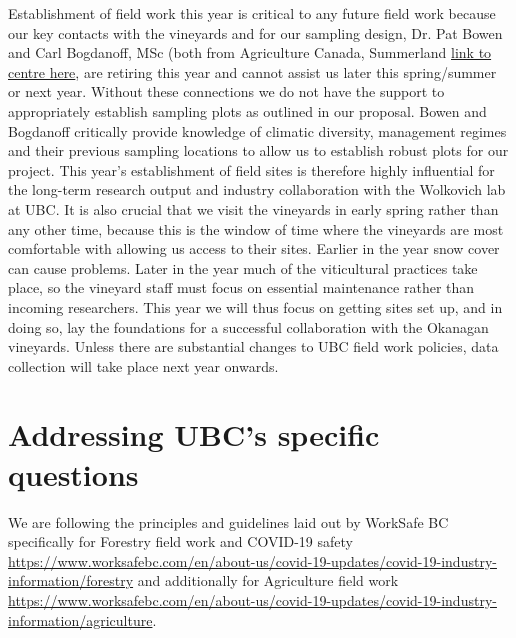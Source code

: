 \documentclass[11pt,letter]{article}
\begin{document}
Establishment of field work this year is critical to any future field work because our key contacts with the vineyards and for our sampling design, Dr. Pat Bowen and Carl Bogdanoff, MSc (both from Agriculture Canada, Summerland \href{https://profils-profiles.science.gc.ca/en/research-centre/summerland-research-and-development-centre}{link to centre here}, are retiring this year and cannot assist us later this spring/summer or next year. Without these connections we do not have the support to appropriately establish sampling plots as outlined in our proposal. Bowen and Bogdanoff critically provide knowledge of climatic diversity, management regimes and their previous sampling locations to allow us to establish robust plots for our project. This year's establishment of field sites is therefore highly influential for the long-term research output and industry collaboration with the Wolkovich lab at UBC. It is also crucial that we visit the vineyards in early spring rather than any other time, because this is the window of time where the vineyards are most comfortable with allowing us access to their sites. Earlier in the year snow cover can cause problems. Later in the year much of the viticultural practices take place, so the vineyard staff must focus on essential maintenance rather than incoming researchers. This year we will thus focus on getting sites set up, and in doing so, lay the foundations for a successful collaboration with the Okanagan vineyards. Unless there are substantial changes to UBC field work policies, data collection will take place next year onwards.

\section{Addressing UBC's specific questions}
We are following the principles and guidelines laid out by WorkSafe BC specifically for Forestry field work and COVID-19 safety \url{https://www.worksafebc.com/en/about-us/covid-19-updates/covid-19-industry-information/forestry} and additionally for Agriculture field work \url{https://www.worksafebc.com/en/about-us/covid-19-updates/covid-19-industry-information/agriculture}.\\
\end{document}
